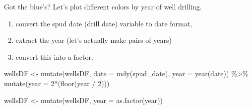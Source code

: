 \documentclass[
  ignorenonframetext,
]{beamer}
\newenvironment{Shaded}{\begin{snugshade}}{\end{snugshade}}
\newcommand{\AttributeTok}[1]{\textcolor[rgb]{0.77,0.63,0.00}{#1}}
\newcommand{\DecValTok}[1]{\textcolor[rgb]{0.00,0.00,0.81}{#1}}
\newcommand{\FunctionTok}[1]{\textcolor[rgb]{0.00,0.00,0.00}{#1}}
\newcommand{\NormalTok}[1]{#1}
\newcommand{\OtherTok}[1]{\textcolor[rgb]{0.56,0.35,0.01}{#1}}
\newcommand{\SpecialCharTok}[1]{\textcolor[rgb]{0.00,0.00,0.00}{#1}}
\begin{document}
\begin{frame}[fragile]{Got the blue's?}
\protect\hypertarget{got-the-blues}{}
Let's plot different colors by year of well drilling.

\begin{enumerate}
[1)]
\item
  convert the spud date (drill date) variable to date format,
\item
  extract the year (let's actually make pairs of years)
\item
  convert this into a factor.
\end{enumerate}

\tiny

\begin{Shaded}
\begin{Highlighting}[]
\NormalTok{wellsDF }\OtherTok{\textless{}{-}} \FunctionTok{mutate}\NormalTok{(wellsDF, }\AttributeTok{date =} \FunctionTok{mdy}\NormalTok{(spud\_date), }\AttributeTok{year =} \FunctionTok{year}\NormalTok{(date)) }\SpecialCharTok{\%\textgreater{}\%}
                 \FunctionTok{mutate}\NormalTok{(}\AttributeTok{year =} \DecValTok{2}\SpecialCharTok{*}\NormalTok{(}\FunctionTok{floor}\NormalTok{(year }\SpecialCharTok{/} \DecValTok{2}\NormalTok{)))}

\NormalTok{wellsDF }\OtherTok{\textless{}{-}} \FunctionTok{mutate}\NormalTok{(wellsDF, }\AttributeTok{year =} \FunctionTok{as.factor}\NormalTok{(year))}
\end{Highlighting}
\end{Shaded}
\end{frame}
\end{document}
